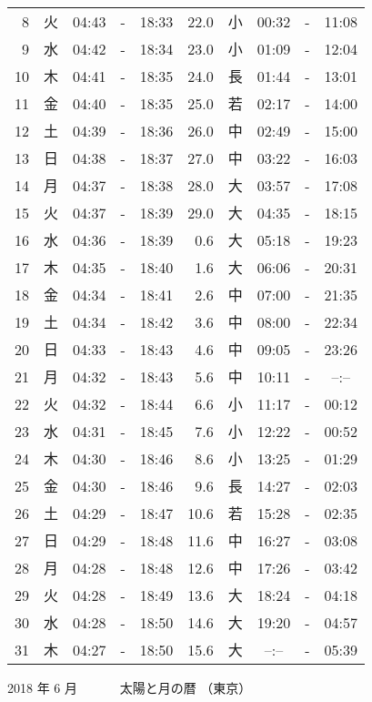 \documentclass[a4j,10pt]{jsarticle}
\begin{document}
\begin{center}
\begin{table}[ht]
\begin{center}
\begin{tabular}{|rc|ccc|rc|ccc|}
  8 & 火 & 04:43 &-& 18:33 & 22.0 & 小 & 00:32 &-& 11:08 \\
  9 & 水 & 04:42 &-& 18:34 & 23.0 & 小 & 01:09 &-& 12:04 \\
 10 & 木 & 04:41 &-& 18:35 & 24.0 & 長 & 01:44 &-& 13:01 \\
 11 & 金 & 04:40 &-& 18:35 & 25.0 & 若 & 02:17 &-& 14:00 \\
 12 & 土 & 04:39 &-& 18:36 & 26.0 & 中 & 02:49 &-& 15:00 \\
 13 & 日 & 04:38 &-& 18:37 & 27.0 & 中 & 03:22 &-& 16:03 \\
 14 & 月 & 04:37 &-& 18:38 & 28.0 & 大 & 03:57 &-& 17:08 \\
 15 & 火 & 04:37 &-& 18:39 & 29.0 & 大 & 04:35 &-& 18:15 \\
 16 & 水 & 04:36 &-& 18:39 &  0.6 & 大 & 05:18 &-& 19:23 \\
 17 & 木 & 04:35 &-& 18:40 &  1.6 & 大 & 06:06 &-& 20:31 \\
 18 & 金 & 04:34 &-& 18:41 &  2.6 & 中 & 07:00 &-& 21:35 \\
 19 & 土 & 04:34 &-& 18:42 &  3.6 & 中 & 08:00 &-& 22:34 \\
 20 & 日 & 04:33 &-& 18:43 &  4.6 & 中 & 09:05 &-& 23:26 \\
 21 & 月 & 04:32 &-& 18:43 &  5.6 & 中 & 10:11 &-& --:-- \\
 22 & 火 & 04:32 &-& 18:44 &  6.6 & 小 & 11:17 &-& 00:12 \\
 23 & 水 & 04:31 &-& 18:45 &  7.6 & 小 & 12:22 &-& 00:52 \\
 24 & 木 & 04:30 &-& 18:46 &  8.6 & 小 & 13:25 &-& 01:29 \\
 25 & 金 & 04:30 &-& 18:46 &  9.6 & 長 & 14:27 &-& 02:03 \\
 26 & 土 & 04:29 &-& 18:47 & 10.6 & 若 & 15:28 &-& 02:35 \\
 27 & 日 & 04:29 &-& 18:48 & 11.6 & 中 & 16:27 &-& 03:08 \\
 28 & 月 & 04:28 &-& 18:48 & 12.6 & 中 & 17:26 &-& 03:42 \\
 29 & 火 & 04:28 &-& 18:49 & 13.6 & 大 & 18:24 &-& 04:18 \\
 30 & 水 & 04:28 &-& 18:50 & 14.6 & 大 & 19:20 &-& 04:57 \\
 31 & 木 & 04:27 &-& 18:50 & 15.6 & 大 & --:-- &-& 05:39 \\
\hline
\end{tabular}
\end{center}
\end{table}
\newpage
{\large 2018 年  6 月}
{\Large 　　　太陽と月の暦   （東京） }

\end{center}
\end{document}
